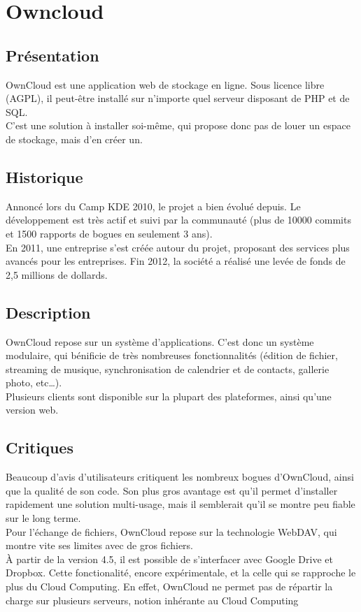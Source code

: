 \chapter{Owncloud}
\thispagestyle{EIP} %
\section{Présentation}
OwnCloud est une application web de stockage en ligne. Sous licence libre (AGPL), il peut-être installé sur n'importe quel serveur disposant de PHP et de SQL.\\
C'est une solution à installer soi-même, qui propose donc pas de louer un espace de stockage, mais d'en créer un.\\

\section{Historique}
Annoncé lors du Camp KDE 2010, le projet a bien évolué depuis. Le développement est très actif et suivi par la communauté (plus de 10000 commits et 1500 rapports de bogues en seulement 3 ans).\\

En 2011, une entreprise s'est créée autour du projet, proposant des services plus avancés pour les entreprises. Fin 2012, la société a réalisé une levée de fonds de 2,5 millions de dollards.

\section{Description}
OwnCloud repose sur un système d'applications. C'est donc un système modulaire, qui bénificie de très nombreuses fonctionnalités (édition de fichier, streaming de musique, synchronisation de calendrier et de contacts, gallerie photo, etc…).\\
Plusieurs clients sont disponible sur la plupart des plateformes, ainsi qu'une version web.\\

\section{Critiques}
Beaucoup d'avis d'utilisateurs critiquent les nombreux bogues d'OwnCloud, ainsi que la qualité de son code. Son plus gros avantage est qu'il permet d'installer rapidement une solution multi-usage, mais il semblerait qu'il se montre peu fiable sur le long terme.\\
Pour l'échange de fichiers, OwnCloud repose sur la technologie WebDAV, qui montre vite ses limites avec de gros fichiers.\\
À partir de la version 4.5, il est possible de s'interfacer avec Google Drive et Dropbox. Cette fonctionalité, encore expérimentale, et la celle qui se rapproche le plus du Cloud Computing. En effet, OwnCloud ne permet pas de répartir la charge sur plusieurs serveurs, notion inhérante au Cloud Computing\\